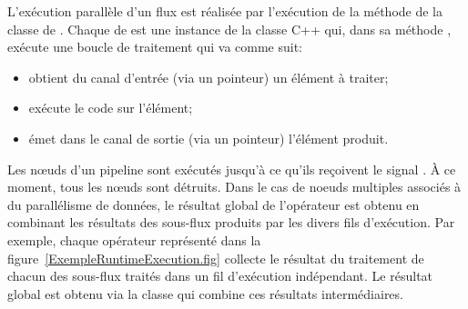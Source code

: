 


L'ex\'ecution parall\`ele d'un flux est r\'ealis\'ee par l'ex\'ecution de la m\'ethode  de la classe  de . Chaque  de  est une instance de la classe C++  qui, dans sa m\'ethode ,  ex\'ecute une boucle de traitement qui va comme suit:
\begin{itemize}
	\item obtient du canal d'entr\'ee (via un pointeur) un \'el\'ement \`a traiter;
	\item ex\'ecute le code sur l'\'el\'ement;
	\item \'emet dans le canal de sortie (via un pointeur)  l'\'el\'ement produit.
\end{itemize}

Les nœuds d'un pipeline sont ex\'ecut\'es jusqu'\`a ce qu'ils re\c coivent le signal . \`A ce moment, tous les nœuds sont d\'etruits. Dans le cas de noeuds multiples associ\'es \`a du parall\'elisme de donn\'ees, le r\'esultat global de l'op\'erateur est obtenu en combinant les r\'esultats des sous-flux produits par les divers fils d'ex\'ecution. Par exemple, chaque op\'erateur  repr\'esent\'e dans la figure~\ref{ExempleRuntimeExecution.fig} collecte le r\'esultat du traitement de chacun des sous-flux trait\'es dans un fil d'ex\'ecution ind\'ependant. Le r\'esultat global est obtenu via la classe  qui combine ces r\'esultats interm\'ediaires.

